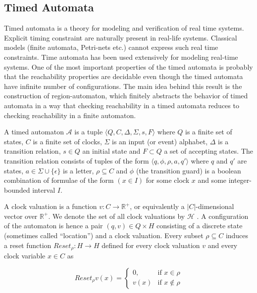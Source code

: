 \documentclass[]{sigplanconf}
\begin{document}
\subsection{Timed Automata}

Timed automata is a theory for modeling and verification of real time systems.  Explicit timing constraint are naturally present in real-life systems. Classical models (finite automata, Petri-nets etc.) cannot express such real time constraints. Time automata \cite{Alur1990, Alur1994183} has been used extensively for modeling real-time systems. One of the most important properties of the timed automata is probably that the reachability properties are decidable \cite{Alur1994183} even though the timed automata have infinite number of configurations. The main idea behind this result is the construction of region-automaton, which finitely abstracts the behavior of timed automata in a way that checking reachability in a timed automata reduces to checking reachability in a finite automaton.

\begin{defns}
A timed automaton  $\mathcal{A}$ is a tuple $\langle Q,C,\Delta ,\Sigma, s,F\rangle$ where $Q$ is a finite set of states, $C$ is a finite set of clocks, $\Sigma$ is an input (or event) alphabet, $\Delta$ is a transition relation, $s \in Q$ an initial state and $F \subset Q$ a set of accepting states. The transition relation consists of tuples of the form $\langle q ,\phi ,\rho, a, q' \rangle$ where $q$ and $q'$  are states, $a \in \Sigma \cup \{\epsilon \}$ is a letter, $\rho \subseteq C$ and $\phi$ (the transition guard) is a boolean combination of formulae of the form $(x \in I)$ for some clock $x$ and some integer-bounded interval $I$.
\end{defns}

A clock valuation is a function $v \colon C \rightarrow \mathbb{R}^+$, or equivalently a $|C|$-dimensional vector over $\mathbb{R}^+$. We denote the set of all clock valuations by $\mathcal{H}$ . A configuration of the automaton is hence a pair $(q,v) \in Q \times H$ consisting of a discrete state (sometimes called “location”) and a clock valuation. Every subset $\rho \subseteq C$ induces a reset function $Reset_\rho : H \rightarrow H$ defined for every clock valuation $v$ and every clock variable $x \in C$ as

\begin{equation}\label{timed_automaton}
Reset_\rho v(x) = \begin{cases}
0, & \text{if $x \in \rho$} \\
v(x) &\text{if $x \notin \rho$}
\end{cases}
\end{equation}
\end{document}
